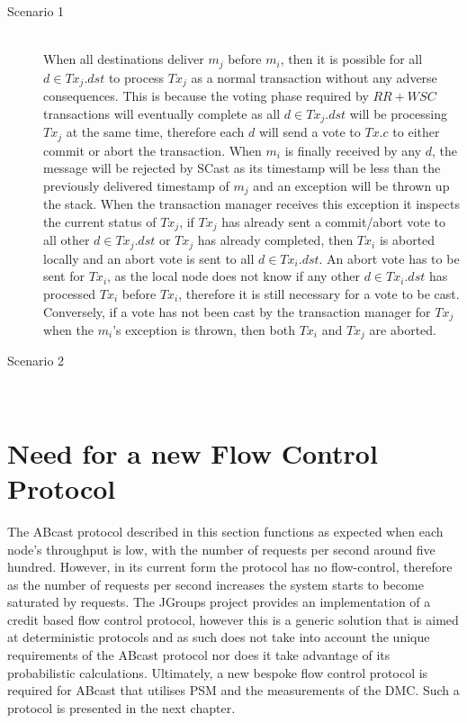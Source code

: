     \begin{description}
         \item[Scenario 1] \hfill \\
         When all destinations deliver $m_j$ before $m_i$, then it is possible for all $d \in Tx_j.dst$ to process $Tx_j$ as a normal transaction without any adverse consequences.  This is because the voting phase required by $RR + WSC$ transactions will eventually complete as all $d \in Tx_j.dst$ will be processing $Tx_j$ at the same time, therefore each $d$ will send a vote to $Tx.c$ to either commit or abort the transaction.  When $m_i$ is finally received by any $d$, the message will be rejected by \textsf{SCast} as its timestamp will be less than the previously delivered timestamp of $m_j$ and an exception will be thrown up the stack.  When the transaction manager receives this exception it inspects the current status of $Tx_j$, if $Tx_j$ has already sent a commit/abort vote to all other $d \in Tx_j.dst$ or $Tx_j$ has already completed, then $Tx_i$ is aborted locally and an abort vote is sent to all $d \in Tx_i.dst$.  An abort vote has to be sent for $Tx_i$, as the local node does not know if any other $d \in Tx_i.dst$ has processed $Tx_i$ before $Tx_i$, therefore it is still necessary for a vote to be cast.  Conversely, if a vote has not been cast by the transaction manager for $Tx_j$ when the $m_i$'s exception is thrown, then both $Tx_i$ and $Tx_j$ are aborted.  
         
         \item[Scenario 2] \hfill \\
                 
    \end{description}        

\section{Need for a new Flow Control Protocol}
The \textsf{ABcast} protocol described in this section functions as expected when each node's throughput is low, with the number of requests per second around five hundred.  However, in its current form the protocol has no flow-control, therefore as the number of requests per second increases the system starts to become saturated by requests.  The JGroups project provides an implementation of a credit based flow control protocol, however this is a generic solution that is aimed at deterministic protocols and as such does not take into account the unique requirements of the \textsf{ABcast} protocol nor does it take advantage of its probabilistic calculations.  Ultimately, a new bespoke flow control protocol is required for \textsf{ABcast} that utilises PSM and the measurements of the DMC.  Such a protocol is presented in the next chapter.  

